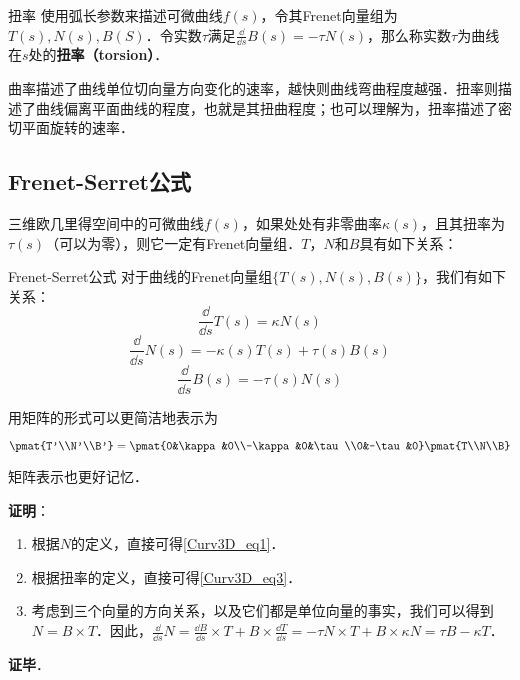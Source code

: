 \begin{definition}{扭率}
使用弧长参数来描述可微曲线$f(s)$，令其Frenet向量组为$T(s), N(s), B(S)$．令实数$\tau$满足$\frac{\dd}{\dd s}B(s)=-\tau N(s)$，那么称实数$\tau$为曲线在$s$处的\textbf{扭率（torsion）}．
\end{definition}

曲率描述了曲线单位切向量方向变化的速率，越快则曲线弯曲程度越强．扭率则描述了曲线偏离平面曲线的程度，也就是其扭曲程度；也可以理解为，扭率描述了密切平面旋转的速率．

\subsection{Frenet-Serret公式}

三维欧几里得空间中的可微曲线$f(s)$，如果处处有非零曲率$\kappa(s)$，且其扭率为$\tau(s)$（可以为零），则它一定有Frenet向量组．$T$，$N$和$B$具有如下关系：

\begin{theorem}{Frenet-Serret公式}
对于曲线的Frenet向量组$\{T(s), N(s), B(s)\}$，我们有如下关系：
\begin{equation}\label{Curv3D_eq1}
\frac{\dd}{\dd s}T(s)=\kappa N(s)
\end{equation}
\begin{equation}\label{Curv3D_eq2}
\frac{\dd}{\dd s}N(s)=-\kappa(s) T(s)+\tau(s) B(s)
\end{equation}
\begin{equation}\label{Curv3D_eq3}
\frac{\dd}{\dd s}B(s)=-\tau(s) N(s)
\end{equation}

用矩阵的形式可以更简洁地表示为

\begin{equation}
\pmat{T'\\N'\\B'}=\pmat{0&\kappa&0\\-\kappa&0&\tau\\0&-\tau&0}\pmat{T\\N\\B}
\end{equation}

矩阵表示也更好记忆．
\end{theorem}

\textbf{证明}：

\begin{enumerate}
\item 根据$N$的定义，直接可得\autoref{Curv3D_eq1}．
\item 根据扭率的定义，直接可得\autoref{Curv3D_eq3}．
\item 考虑到三个向量的方向关系，以及它们都是单位向量的事实，我们可以得到$N=B\times T$．因此，$\frac{\dd}{\dd s}N=\frac{\dd B}{\dd s}\times T+B\times\frac{\dd T}{\dd s}=-\tau N\times T+B\times\kappa N=\tau B-\kappa T$．
\end{enumerate}

\textbf{证毕}．





